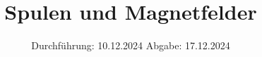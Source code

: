 

\subject{V308}
\title{Spulen und Magnetfelder}
\date{%
  Durchführung: 10.12.2024
  \hspace{3em}
  Abgabe: 17.12.2024
}



\maketitle
\thispagestyle{empty}
\tableofcontents
\newpage






\printbibliography{}


